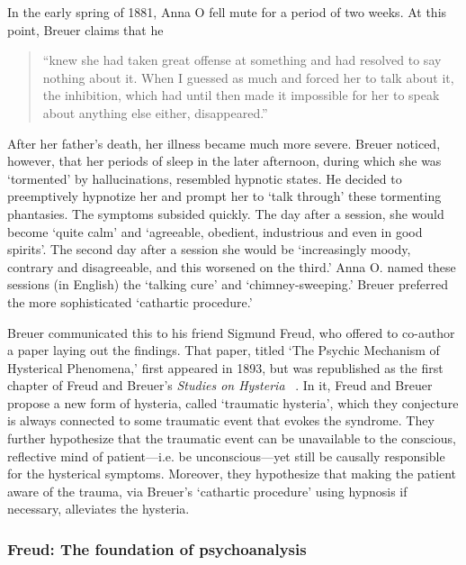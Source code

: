 \begin{refsection}
In the early spring of 1881, Anna O fell mute for a period of two weeks. At this point, Breuer claims that he 

\begin{quote}

“knew she had taken great offense at something and had resolved to say nothing about it. When I guessed as much and forced her to talk about it, the inhibition, which had until then made it impossible for her to speak about anything else either, disappeared.” ~\citep[p 29]{Freud:kVwxqGOZ}
\end{quote}

After her father's death, her illness became much more severe. Breuer noticed, however, that her periods of sleep in the later afternoon, during which she was `tormented' by hallucinations, resembled hypnotic states. He decided to preemptively hypnotize her and prompt her to `talk through' these tormenting phantasies. The symptoms subsided quickly. The day after a session, she would become `quite calm' and `agreeable, obedient, industrious and even in good spirits'. The second day after a session she would be `increasingly moody, contrary and disagreeable, and this worsened on the third.' Anna O. named these sessions (in English) the `talking cure' and `chimney-sweeping.' Breuer preferred the more sophisticated `cathartic procedure.'

Breuer communicated this to his friend Sigmund Freud, who offered to co-author a paper laying out the findings. That paper, titled `The Psychic Mechanism of Hysterical Phenomena,' first appeared in 1893, but was republished as the first chapter of Freud and Breuer's \emph{Studies on Hysteria} ~\citep[1895]{Freud:kVwxqGOZ}. In it, Freud and Breuer propose a new form of hysteria, called `traumatic hysteria', which they conjecture is always connected to some traumatic event that evokes the syndrome. They further hypothesize that the traumatic event can be unavailable to the conscious, reflective mind of patient---i.e. be unconscious---yet still be causally responsible for the hysterical symptoms. Moreover, they hypothesize that making the patient aware of the trauma, via Breuer’s `cathartic procedure' using hypnosis if necessary, alleviates the hysteria.

\subsubsection{Freud: The foundation of psychoanalysis}
\label{freud:thefoundationofpsychoanalysis}


\end{refsection}
